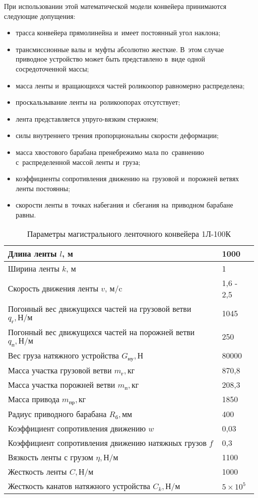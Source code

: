 При использовании этой математической модели конвейера принимаются следующие допущения:
\begin{itemize}
\item трасса конвейера прямолинейна и~имеет постоянный угол наклона;
\item трансмиссионные валы и~муфты абсолютно жесткие. В~этом случае приводное устройство может быть представлено в~виде одной сосредоточенной массы;
\item масса ленты и~вращающихся частей роликоопор равномерно распределена;
\item проскальзывание ленты на~роликоопорах отсутствует;
\item лента представляется упруго-вязким стержнем;
\item силы внутреннего трения пропорциональны скорости деформации;
\item масса хвостового барабана пренебрежимо мала по~сравнению с~распределенной массой ленты и~груза;
\item коэффициенты сопротивления движению на~грузовой и~порожней ветвях ленты постоянны;
\item скорости ленты в~точках набегания и~сбегания на~приводном барабане равны.
\end{itemize}

\begin{table}[h]
\caption{Параметры магистрального ленточного конвейера 1Л-100К}
\label{tabl:konv_params}
\begin{center}
\begin{tabular}{|l|l|}
\hline
Длина ленты $l$, м & 1000 \\
\hline
Ширина ленты $k$, м & 1 \\
\hline
Скорость движения ленты $v$, м/c & 1,6 - 2,5 \\
\hline
Погонный вес движущихся частей на грузовой ветви $q_\text{г}, \text{Н/м}$ & 1045\\
\hline
Погонный вес движущихся частей на порожней ветви $q_\text{п}, \text{Н/м}$ & 250\\
\hline
Вес груза натяжного устройства $G_\text{ну}, \text{Н}$ & 80000 \\
\hline
Масса участка грузовой ветви $m_\text{г}, \text{кг}$ & 870,8 \\
\hline
Масса участка порожней ветви $m_\text{п}, \text{кг}$ & 208,3 \\
\hline
Масса привода $m_\text{пр}, \text{кг}$ & 1850 \\
\hline
Радиус приводного барабана $R_\text{б}, \text{мм}$ & 400 \\
\hline
Коэффициент сопротивления движению $w$ & 0,03 \\
\hline
Коэффициент сопротивления движению натяжных грузов $f$ & 0,3 \\
\hline
Вязкость ленты с грузом $\eta, \text{Н/м} $ & 1100 \\
\hline
Жесткость ленты $C, \text{Н/м} $ & 1000 \\
\hline
Жесткость канатов натяжного устройства $ C_k, \text{Н/м} $ & $ 5 \times 10^5 $ \\
\hline
\end{tabular}
\end{center}
\end{table}

